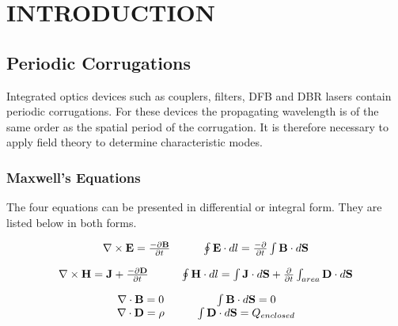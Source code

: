 
\chapter{INTRODUCTION} \label{ch:introduction}

\section{Periodic Corrugations}

Integrated optics devices such as couplers, filters, DFB and DBR
lasers contain periodic corrugations. For these devices the
propagating wavelength is of the same order as the spatial period of
the corrugation. It is therefore necessary to apply field theory to
determine characteristic modes.

\subsection{Maxwell's Equations}
The four equations can be presented in differential or integral
form. They are listed below in both forms.

\begin{equation}
\begin{array}{c c}
\nabla \times \mathbf{E} = \frac{-\partial{\mathbf{B}}}{\partial{t}} &
\qquad \oint \mathbf{E} \cdot dl = \frac{-\partial}{\partial{t}}\int
\mathbf{B} \cdot d \mathbf{S} \\
\end{array}
\label{curlE}
\end{equation}

\begin{equation}
\begin{array}{c c}
\nabla \times \mathbf{H} = \mathbf{J} + 
\frac{-\partial{\mathbf{D}}}{\partial{t}} &
\qquad \oint \mathbf{H} \cdot dl = \int \mathbf{J} \cdot d \mathbf{S}
+ \frac{\partial}{\partial{t}}\int_{area} \mathbf{D} \cdot d \mathbf{S}
\end{array}
\label{curlH}
\end{equation}

\begin{equation}
\begin{array}{c c}
\nabla \cdot \mathbf{B} = 0 &
\qquad \int \mathbf{B} \cdot d\mathbf{S} = 0 \\
\nabla \cdot \mathbf{D} = \rho &
\qquad \int \mathbf{D} \cdot d\mathbf{S} = Q_{enclosed}
\end{array}
\end{equation}

